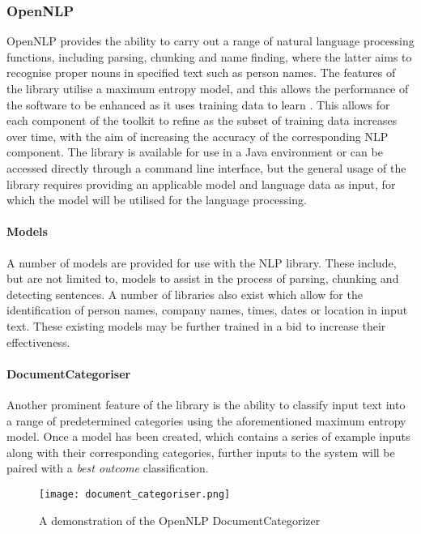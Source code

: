 \subsubsection{OpenNLP}

OpenNLP provides the ability to carry out a range of natural language processing
functions, including parsing, chunking and name finding, where the latter aims
to recognise proper nouns in specified text such as person names. The features
of the library utilise a maximum entropy model, and this allows the performance
of the software to be enhanced as it uses training data to learn
\citep{apache13}. This allows for each component of the toolkit to refine as the
subset of training data increases over time, with the aim of increasing the
accuracy of the corresponding NLP component. The library is available for use in
a Java environment or can be accessed directly through a command line interface,
but the general usage of the library requires providing an applicable model and
language data as input, for which the model will be utilised for the language
processing.

\paragraph{Models}

A number of models are provided for use with the NLP library. These include, but
are not limited to, models to assist in the process of parsing, chunking and
detecting sentences. A number of libraries also exist which allow for the
identification of person names, company names, times, dates or location in input
text. These existing models may be further trained in a bid to increase their
effectiveness.

\paragraph{DocumentCategoriser}

Another prominent feature of the library is the ability to classify input text
into a range of predetermined categories using the aforementioned maximum
entropy model. Once a model has been created, which contains a series of example
inputs along with their corresponding categories, further inputs to the system
will be paired with a \emph{best outcome} classification.

\begin{figure}[H]
	\centering
	\texttt{[image: document\_categoriser.png]}
	\caption{A demonstration of the OpenNLP DocumentCategorizer}
\end{figure}

